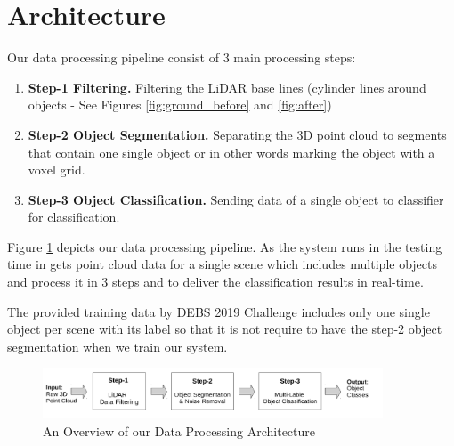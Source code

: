 \section{Architecture}\label{sec:Architecture}



Our data processing pipeline consist of 3 main processing steps: 

\begin{enumerate}
  \item \textbf{Step-1  Filtering. } Filtering the LiDAR base lines (cylinder lines around objects - See Figures \ref{fig:ground_before} and \ref{fig:after})
  \item \textbf{Step-2 Object Segmentation.} Separating the 3D point cloud to segments that contain one single object or in other words marking the object with a voxel grid.  
  \item \textbf{Step-3 Object Classification.}  Sending data of a single object to classifier for classification.  
\end{enumerate}


Figure \ref{fig:dataPipeline} depicts our data processing pipeline. As the system runs in the testing time in gets point cloud data for a single scene which includes multiple objects and process it in 3 steps and to deliver the classification results in real-time.   

The provided training data by DEBS 2019 Challenge \cite{DEBSGC2019} includes only one single object per scene with its label so that it is not require to have the step-2 object segmentation when we train our system.


\begin{figure}[ht!]
 \begin{center}
   \includegraphics[width=0.9\textwidth]{./images/DataProcessingPipleline.pdf}
   \caption{An Overview of our Data Processing Architecture}
   \label{fig:dataPipeline}
 \end{center}
\end{figure}




